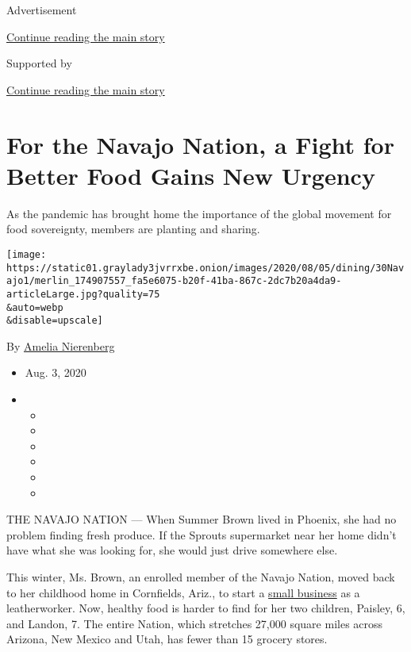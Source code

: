 Advertisement

\protect\hyperlink{after-top}{Continue reading the main story}

Supported by

\protect\hyperlink{after-sponsor}{Continue reading the main story}

\hypertarget{for-the-navajo-nation-a-fight-for-better-food-gains-new-urgency-}{%
\section{For the Navajo Nation, a Fight for Better Food Gains New
Urgency
}\label{for-the-navajo-nation-a-fight-for-better-food-gains-new-urgency-}}

As the pandemic has brought home the importance of the global movement
for food sovereignty, members are planting and sharing.

\texttt{[image: https://static01.graylady3jvrrxbe.onion/images/2020/08/05/dining/30Navajo1/merlin\_174907557\_fa5e6075-b20f-41ba-867c-2dc7b20a4da9-articleLarge.jpg?quality=75\\\&auto=webp\\\&disable=upscale]}

By \href{https://www.nytimes3xbfgragh.onion/by/amelia-nierenberg}{Amelia
Nierenberg}

\begin{itemize}
\item
  Aug. 3, 2020
\item
  \begin{itemize}
  \item
  \item
  \item
  \item
  \item
  \item
  \end{itemize}
\end{itemize}

THE NAVAJO NATION --- When Summer Brown lived in Phoenix, she had no
problem finding fresh produce. If the Sprouts supermarket near her home
didn't have what she was looking for, she would just drive somewhere
else.

This winter, Ms. Brown, an enrolled member of the Navajo Nation, moved
back to her childhood home in Cornfields, Ariz., to start a
\href{https://www.lotusandlayneleather.com/}{small business} as a
leatherworker. Now, healthy food is harder to find for her two children,
Paisley, 6, and Landon, 7. The entire Nation, which stretches 27,000
square miles across Arizona, New Mexico and Utah, has fewer than 15
grocery stores.

